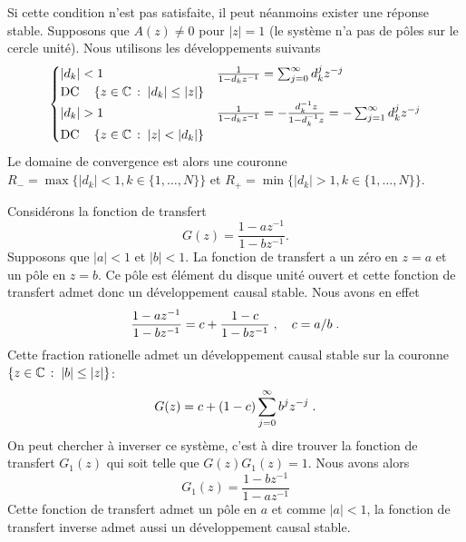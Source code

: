Si cette condition n'est pas satisfaite, il peut néanmoins exister une réponse stable. Supposons que $A(z) \ne 0$ pour $|z|=1$ (le système n'a pas de pôles sur le cercle unité). Nous utilisons les développements suivants
\begin{equation}
\label{eq:developpement-pole}
\begin{cases}
|d_k| < 1 & \frac{1}{1-d_k z^{-1}}= \sum_{j=0}^\infty d_k^j z^{-j} \\
 \mathrm{DC} \quad \left\{ z \in \mathbb{C}\,:\; |d_k| \leq |z|\right\} \\
|d_k| > 1 & \frac{1}{1-d_k z^{-1}}= - \frac{d_k^{-1} z}{1 - d_k^{-1} z} = - \sum_{j=1}^\infty d_k^j z^{-j} \\
 \mathrm{DC} \quad \left\{z \in \mathbb{C}\,:\; |z| < |d_k|\right\}
\end{cases}
\end{equation}
Le domaine de convergence est alors une couronne $R_- = \max \{ |d_k| < 1, k \in \{1, \dots, N\} \}$ et $R_+= \min \{ |d_k| > 1, k \in \{1, \dots, N\} \}$.
\begin{example}
Considérons la fonction de transfert
\[
G(z)= \frac{1-az^{-1}}{1-bz^{-1}} .
\]
Supposons que $|a| < 1$ et $|b| < 1$. La fonction de transfert a un zéro en $z=a$ et un pôle en $z=b$. Ce pôle est élément du disque unité ouvert et cette fonction de transfert admet donc un développement causal stable. Nous avons en effet
\[
\frac{1-az^{-1}}{1-bz^{-1}} = c + \frac{1-c}{1-b z^{-1}} \;, \quad c= a/b \;.
\]
Cette fraction rationelle admet un développement causal stable sur la couronne $\left\{z \in \mathbb{C}\,:\; |b| \leq |z|\right\}$:
\[
G(z) = c + (1-c) \sum_{j=0}^\infty b^j z^{-j} \;.
\]
On peut chercher à inverser ce système, c'est à dire trouver la fonction de transfert $G_1(z)$ qui soit telle que $G(z) G_1(z)= 1$.
Nous avons alors 
\[
G_1(z)= \frac{1-bz^{-1}}{1-a z^{-1}}
\]
Cette fonction de transfert admet un pôle en $a$ et comme $|a| < 1$, la fonction de transfert inverse admet aussi un développement causal stable. 
\end{example}
